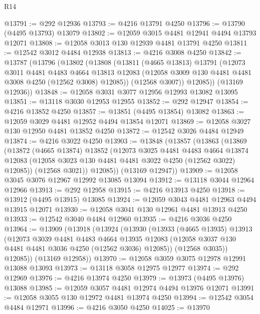\begin{lexlean}{R14}
\begin{coremodule}
@13791 := @292 @12936
@13793 := @4216 @13791 @4250
@13796 := @13790 (@4495 @13793) @13079
@13802 := @12059 @3015 @4481 @12941 @4494 @13793 @12071
@13808 := @12058 @3013 @130 @12939 @4481 @13791 @4250
@13811 := @12542 @3012 @4484 @12938
@13813 := @4216 @3008 @4250
@13842 := @13787
    (@13796
      (@13802
        (@13808
          (@13811
            (@4665 @13813)
            @13791
            (@12073
              @3011
              @4481
              @4483
              @4664
              @13813
              @12083
              (@12058 @3009 @130 @4481 @4481 @3008 @4250 (@12562 @3008) @12085))
            (@12568 @3007))
          @12085))
      (@13169 @12936))
@13848 := @12058 @3031 @3077 @12956 @12993 @13082 @13095
@13851 := @13118 @3030 @12953 @12955
@13852 := @292 @12947
@13854 := @4216 @13852 @4250
@13857 := @13851 (@4495 @13854) @13082
@13863 := @12059 @3029 @4481 @12952 @4494 @13854 @12071
@13869 := @12058 @3027 @130 @12950 @4481 @13852 @4250
@13872 := @12542 @3026 @4484 @12949
@13874 := @4216 @3022 @4250
@13903 := @13848
    (@13857
      (@13863
        (@13869
          (@13872
            (@4665 @13874)
            @13852
            (@12073
              @3025
              @4481
              @4483
              @4664
              @13874
              @12083
              (@12058 @3023 @130 @4481 @4481 @3022 @4250 (@12562 @3022) @12085))
            (@12568 @3021))
          @12085))
      (@13169 @12947))
@13909 := @12058 @3045 @3076 @12967 @12992 @13085 @13094
@13912 := @13118 @3044 @12964 @12966
@13913 := @292 @12958
@13915 := @4216 @13913 @4250
@13918 := @13912 (@4495 @13915) @13085
@13924 := @12059 @3043 @4481 @12963 @4494 @13915 @12071
@13930 := @12058 @3041 @130 @12961 @4481 @13913 @4250
@13933 := @12542 @3040 @4484 @12960
@13935 := @4216 @3036 @4250
@13964 := @13909
    (@13918
      (@13924
        (@13930
          (@13933
            (@4665 @13935)
            @13913
            (@12073
              @3039
              @4481
              @4483
              @4664
              @13935
              @12083
              (@12058 @3037 @130 @4481 @4481 @3036 @4250 (@12562 @3036) @12085))
            (@12568 @3035))
          @12085))
      (@13169 @12958))
@13970 := @12058 @3059 @3075 @12978 @12991 @13088 @13093
@13973 := @13118 @3058 @12975 @12977
@13974 := @292 @12969
@13976 := @4216 @13974 @4250
@13979 := @13973 (@4495 @13976) @13088
@13985 := @12059 @3057 @4481 @12974 @4494 @13976 @12071
@13991 := @12058 @3055 @130 @12972 @4481 @13974 @4250
@13994 := @12542 @3054 @4484 @12971
@13996 := @4216 @3050 @4250
@14025 := @13970

\end{coremodule}
\end{lexlean}
